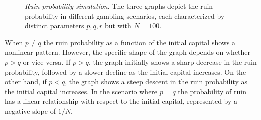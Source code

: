 \documentclass[11pt,twoside]{article}
\numberwithin{Theorem}{section}
\numberwithin{Definition}{section}
\numberwithin{Lemma}{section}
\numberwithin{Algorithm}{section}
\numberwithin{equation}{section}
\begin{document}
\begin{figure}[h!]
  \centering
  \caption[Ruin probability simulation]{\textit{Ruin probability simulation}. The three graphs depict the ruin probability in different gambling scenarios, each characterized by distinct parameters $p,q,r$ but with $N = 100$.}  
  \label{fig:ruin_proba}
\end{figure}

When $p\neq q$ the ruin probability as a function of the initial capital shows a nonlinear pattern. However, the specific shape of the graph depends on whether $p > q$ or vice versa. If $p > q$, the graph initially shows a sharp decrease in the ruin probability, followed by a slower decline as the initial capital increases. On the other hand, if $p < q$, the graph shows a steep descent in the ruin probability as the initial capital increases. In the scenario where $p = q$ the probability of ruin has a linear relationship with respect to the initial capital, represented by a negative slope of $1/N$. 
\end{document}
